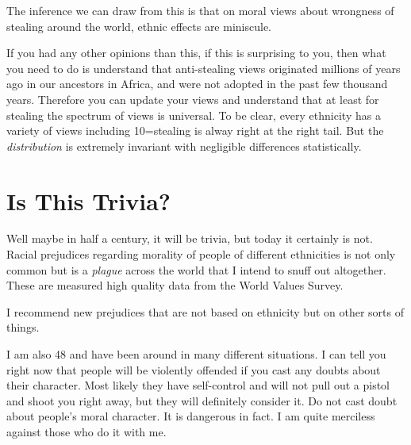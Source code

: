 \documentclass{amsart}
\begin{document}
The inference we can draw from this is that on moral views about wrongness of stealing around the world, ethnic effects are miniscule.  

If you had any other opinions than this, if this is surprising to you, then what you need to do is understand that anti-stealing views originated millions of years ago in our ancestors in Africa, and were not adopted in the past few thousand years.  Therefore you can update your views and understand that at least for stealing the spectrum of views is universal.  To be clear, every ethnicity has a variety of views including 10=stealing is alway right at the right tail.  But the {\em distribution} is extremely invariant with negligible differences statistically.  

\section{Is This Trivia?}

Well maybe in half a century, it will be trivia, but today it certainly is not.  Racial prejudices regarding morality of people of different ethnicities is not only common but is a {\em plague} across the world that I intend to snuff out altogether.  These are measured high quality data from the World Values Survey.  

I recommend new prejudices that are not based on ethnicity but on other sorts of things.  

I am also 48 and have been around in many different situations.  I can tell you right now that people will be violently offended if you cast any doubts about their character.  Most likely they have self-control and will not pull out a pistol and shoot you right away, but they will definitely consider it.  Do not cast doubt about people's moral character.  It is dangerous in fact.  I am quite merciless against those who do it with me.
\end{document}
